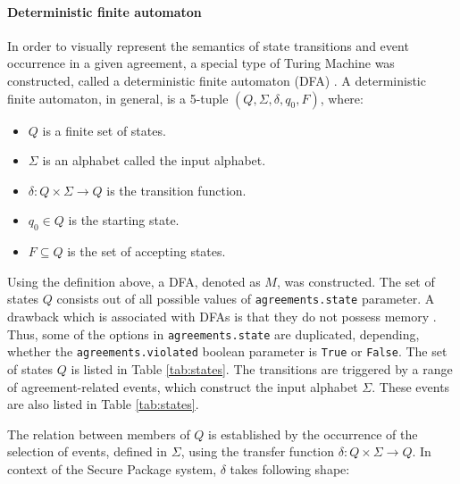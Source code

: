 \paragraph{Deterministic finite automaton}

In order to visually represent the semantics of state transitions and event occurrence in a given agreement, a special type of Turing Machine was constructed, called a deterministic finite automaton (DFA) \citep{dfa}. A deterministic finite automaton, in general, is a 5-tuple $(Q, \Sigma, \delta, q_{0}, F)$, where:

\begin{itemize}
\item $Q$ is a finite set of states.
\item $\Sigma$ is an alphabet called the input alphabet.
\item $\delta: Q \times \Sigma \rightarrow Q$ is the transition function.
\item $q_0 \in Q$ is the starting state.
\item $F \subseteq Q$ is the set of accepting states.
\end{itemize}

Using the definition above, a DFA, denoted as $M$, was constructed. The set of states $Q$ consists out of all possible values of \texttt{agreements.state} parameter. A drawback which is associated with DFAs is that they do not possess memory \citep{alexisdfa}. Thus, some of the options in \texttt{agreements.state} are duplicated, depending, whether the \texttt{agreements.violated} boolean parameter is \texttt{True} or \texttt{False}. The set of states $Q$ is listed in Table \ref{tab:states}. The transitions are triggered by a range of agreement-related events, which construct the input alphabet $\Sigma$. These events are also listed in Table \ref{tab:states}.


The relation between members of $Q$ is established by the occurrence of the selection of events, defined in $\Sigma$, using the transfer function  $\delta: Q \times \Sigma \rightarrow Q$. In context of the Secure Package system, $\delta$ takes following shape:
\bigskip


